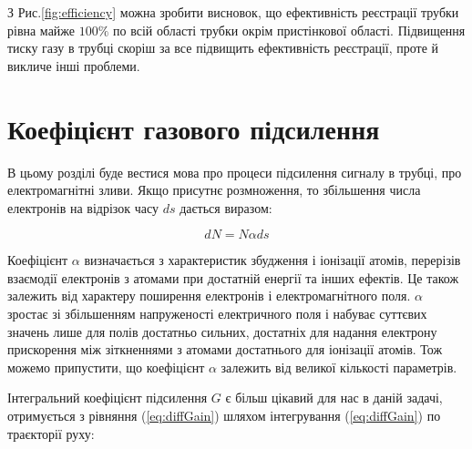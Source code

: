 \documentclass[pdftex,14pt]{scrartcl}
\begin{document}
\begin{spacing}{1.5}
	З Рис.\ref{fig:efficiency}  можна зробити висновок, що ефективність реєстрації трубки рівна майже $100\%$  по всій області трубки окрім пристінкової області. Підвищення тиску газу в трубці скоріш за все підвищить ефективність реєстрації, проте й викличе інші проблеми.
	
	
		 
	\section{ Коефіцієнт газового підсилення}
	
	В цьому розділі буде вестися мова про процеси підсилення сигналу в трубці, про електромагнітні зливи. Якщо присутнє розмноження, то збільшення числа електронів на відрізок часу $ds$ дається виразом:
	
	
	\begin{equation}
		dN = N \alpha ds
		\label{eq:diffGain}
	\end{equation}

	Коефіцієнт $\alpha$  визначається з характеристик збудження і іонізації атомів, перерізів взаємодії електронів з атомами при достатній енергії та інших ефектів. Це також залежить від характеру поширення електронів і електромагнітного поля. $\alpha$ зростає зі збільшенням напруженості електричного поля і набуває суттєвих значень лише для полів достатньо сильних, достатніх для надання електрону прискорення між зіткненнями  з атомами достатнього для іонізації атомів. Тож можемо припустити, що коефіцієнт $\alpha$  залежить від великої кількості параметрів.
	
	Інтегральний коефіцієнт  підсилення $G$ є більш цікавий для нас в даній задачі, отримується з рівняння (\ref{eq:diffGain}) шляхом інтегрування (\ref{eq:diffGain}) по траєкторії руху:
	
	

\end{spacing}
\end{document}
